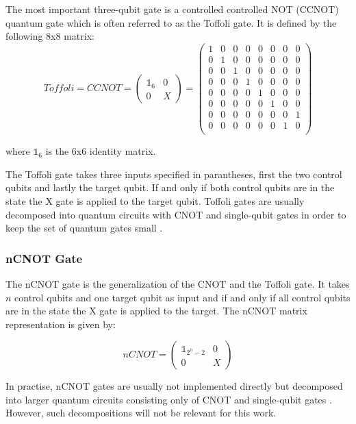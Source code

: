 The most important three-qubit gate is a controlled controlled NOT (CCNOT) quantum gate which is often referred to as the Toffoli gate. It is defined by the following 8x8 matrix:
\begin{equation}
Toffoli = CCNOT = \begin{pmatrix}
 \mathbb{1}_6 & 0 \\ 
 0 & X
 \end{pmatrix} = \begin{pmatrix}
 1 & 0 & 0 & 0 & 0 & 0 & 0 & 0 \\ 
 0 & 1 & 0 & 0 & 0 & 0 & 0 & 0 \\ 
 0 & 0 & 1 & 0 & 0 & 0 & 0 & 0 \\ 
 0 & 0 & 0 & 1 & 0 & 0 & 0 & 0 \\ 
 0 & 0 & 0 & 0 & 1 & 0 & 0 & 0 \\ 
 0 & 0 & 0 & 0 & 0 & 1 & 0 & 0 \\
 0 & 0 & 0 & 0 & 0 & 0 & 0 & 1 \\ 
 0 & 0 & 0 & 0 & 0 & 0 & 1 & 0 \\ 
 \end{pmatrix}
\end{equation}

where $\mathbb{1}_6$ is the 6x6 identity matrix.

The Toffoli gate takes three inputs specified in parantheses, first the two control qubits and lastly the target qubit. If and only if both control qubits are in the \1 state the X gate is applied to the target qubit. Toffoli gates are usually decomposed into quantum circuits with CNOT and single-qubit gates in order to keep the set of quantum gates small \cite{shende2008cnot}.

\subsubsection{nCNOT Gate}
\label{subsubsubsec:ncnotgate}

The nCNOT gate is the generalization of the CNOT and the Toffoli gate. It takes $n$ control qubits and one target qubit as input and if and only if all control qubits are in the \1 state the X gate is applied to the target. The nCNOT matrix representation is given by:
 
\begin{equation}
nCNOT = \begin{pmatrix}
 \mathbb{1}_{2^n-2} & 0 \\ 
 0 & X
 \end{pmatrix}
\end{equation}

In practise, nCNOT gates are usually not implemented directly but decomposed into larger quantum circuits consisting only of CNOT and single-qubit gates \cite{nielsen2010quantum}. However, such decompositions will not be relevant for this work.

